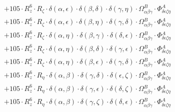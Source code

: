 \documentclass{article}
\begin{document}
\begin{equation}
\begin{array}{c}
 \\[0.2em] 		 + 105 \cdot R_{z}^{6} \cdot R_{\zeta{}} \cdot \delta{}\left(\alpha{}, \epsilon{}\right) \cdot \delta{}\left(\beta{}, \delta{}\right) \cdot \delta{}\left(\gamma{}, \eta{}\right) \cdot \Omega{}^{B}_{\alpha{}\beta{}\gamma{}} \cdot \Phi{}^{A}_{\delta{}\epsilon{}\zeta{}\eta{}} 
 \\[0.2em] 		 + 105 \cdot R_{z}^{6} \cdot R_{\zeta{}} \cdot \delta{}\left(\alpha{}, \epsilon{}\right) \cdot \delta{}\left(\beta{}, \eta{}\right) \cdot \delta{}\left(\gamma{}, \delta{}\right) \cdot \Omega{}^{B}_{\alpha{}\beta{}\gamma{}} \cdot \Phi{}^{A}_{\delta{}\epsilon{}\zeta{}\eta{}} 
 \\[0.2em] 		 + 105 \cdot R_{z}^{6} \cdot R_{\zeta{}} \cdot \delta{}\left(\alpha{}, \eta{}\right) \cdot \delta{}\left(\beta{}, \gamma{}\right) \cdot \delta{}\left(\delta{}, \epsilon{}\right) \cdot \Omega{}^{B}_{\alpha{}\beta{}\gamma{}} \cdot \Phi{}^{A}_{\delta{}\epsilon{}\zeta{}\eta{}} 
 \\[0.2em] 		 + 105 \cdot R_{z}^{6} \cdot R_{\zeta{}} \cdot \delta{}\left(\alpha{}, \eta{}\right) \cdot \delta{}\left(\beta{}, \delta{}\right) \cdot \delta{}\left(\gamma{}, \epsilon{}\right) \cdot \Omega{}^{B}_{\alpha{}\beta{}\gamma{}} \cdot \Phi{}^{A}_{\delta{}\epsilon{}\zeta{}\eta{}} 
 \\[0.2em] 		 + 105 \cdot R_{z}^{6} \cdot R_{\zeta{}} \cdot \delta{}\left(\alpha{}, \eta{}\right) \cdot \delta{}\left(\beta{}, \epsilon{}\right) \cdot \delta{}\left(\gamma{}, \delta{}\right) \cdot \Omega{}^{B}_{\alpha{}\beta{}\gamma{}} \cdot \Phi{}^{A}_{\delta{}\epsilon{}\zeta{}\eta{}} 
 \\[0.2em] 		 + 105 \cdot R_{z}^{6} \cdot R_{\eta{}} \cdot \delta{}\left(\alpha{}, \beta{}\right) \cdot \delta{}\left(\gamma{}, \delta{}\right) \cdot \delta{}\left(\epsilon{}, \zeta{}\right) \cdot \Omega{}^{B}_{\alpha{}\beta{}\gamma{}} \cdot \Phi{}^{A}_{\delta{}\epsilon{}\zeta{}\eta{}} 
 \\[0.2em] 		 + 105 \cdot R_{z}^{6} \cdot R_{\eta{}} \cdot \delta{}\left(\alpha{}, \beta{}\right) \cdot \delta{}\left(\gamma{}, \epsilon{}\right) \cdot \delta{}\left(\delta{}, \zeta{}\right) \cdot \Omega{}^{B}_{\alpha{}\beta{}\gamma{}} \cdot \Phi{}^{A}_{\delta{}\epsilon{}\zeta{}\eta{}} 
 \\[0.2em] 		 + 105 \cdot R_{z}^{6} \cdot R_{\eta{}} \cdot \delta{}\left(\alpha{}, \beta{}\right) \cdot \delta{}\left(\gamma{}, \zeta{}\right) \cdot \delta{}\left(\delta{}, \epsilon{}\right) \cdot \Omega{}^{B}_{\alpha{}\beta{}\gamma{}} \cdot \Phi{}^{A}_{\delta{}\epsilon{}\zeta{}\eta{}} 

\end{array}
\end{equation}
\end{document}

